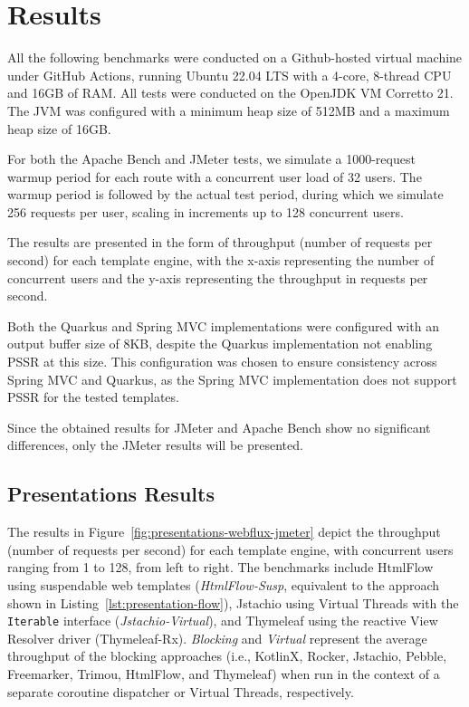 \section{Results}

All the following benchmarks were conducted on a Github-hosted virtual machine
under GitHub Actions, running Ubuntu 22.04 LTS with a 4-core, 8-thread CPU and
16GB of RAM\@. All tests were conducted on the OpenJDK VM Corretto 21. The JVM
was configured with a minimum heap size of 512MB and a maximum heap size of
16GB\@.

For both the Apache Bench and JMeter tests, we simulate a 1000-request warmup
period for each route with a concurrent user load of 32 users. The warmup
period is followed by the actual test period, during which we simulate 256
requests per user, scaling in increments up to 128 concurrent users.

The results are presented in the form of throughput (number of requests per
second) for each template engine, with the x-axis representing the number of
concurrent users and the y-axis representing the throughput in requests per
second.

Both the Quarkus and Spring MVC implementations were configured with an output
buffer size of 8KB, despite the Quarkus implementation not enabling PSSR at
this size. This configuration was chosen to ensure consistency across Spring
MVC and Quarkus, as the Spring MVC implementation does not support PSSR for the
tested templates.

Since the obtained results for JMeter and Apache Bench show no significant
differences, only the JMeter results will be presented.

\subsection{Presentations Results}

The results in Figure~\ref{fig:presentations-webflux-jmeter} depict the
throughput (number of requests per second) for each template engine, with
concurrent users ranging from 1 to 128, from left to right. The benchmarks
include HtmlFlow using suspendable web templates (\textit{HtmlFlow-Susp},
equivalent to the approach shown in Listing~\ref{lst:presentation-flow}),
Jstachio using Virtual Threads with the \texttt{Iterable} interface
(\textit{Jstachio-Virtual}), and Thymeleaf using the reactive View Resolver
driver (Thymeleaf-Rx). \textit{Blocking} and \textit{Virtual} represent the
average throughput of the blocking approaches (i.e., KotlinX, Rocker, Jstachio,
Pebble, Freemarker, Trimou, HtmlFlow, and Thymeleaf) when run in the context of
a separate coroutine dispatcher or Virtual Threads, respectively.

